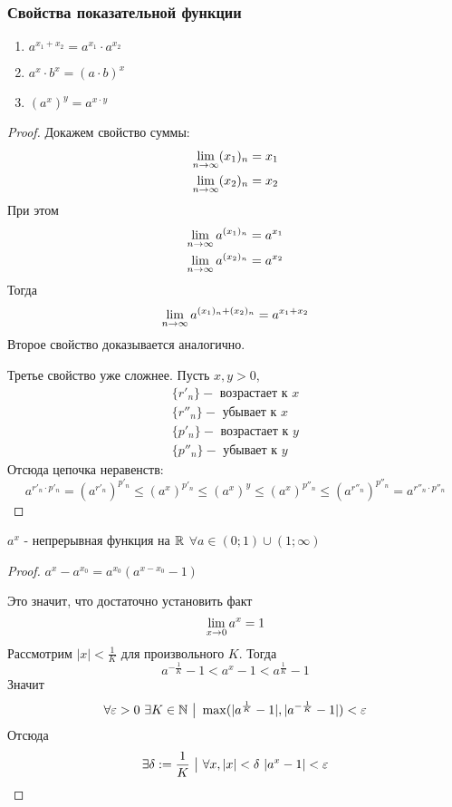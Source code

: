 \subsubsection*{Свойства показательной функции}

\begin{enumerate}
	\item $a^{x_1 + x_2} = a^{x_1} \cdot a^{x_2}$
	\item $a^x \cdot b^x = (a \cdot b)^x$
	\item $(a^x)^y = a^{x \cdot y}$
\end{enumerate}

\begin{proof}
	Докажем свойство суммы:
	\begin{align*}
		\lim\limits_{n \to \infty} (x_1)_n = x_1
		\\
		\lim\limits_{n \to \infty} (x_2)_n = x_2
	\end{align*}
	При этом
	\begin{align*}
		\lim\limits_{n \to \infty} a^{(x_1)_n} = a^{x_1}
		\\
		\lim\limits_{n \to \infty} a^{(x_2)_n} = a^{x_2}
	\end{align*}
	Тогда
	$$
		\lim\limits_{n \to \infty} a^{(x_1)_n + (x_2)_n} = a^{x_1 + x_2}
	$$
	Второе свойство доказывается аналогично.
	
	Третье свойство уже сложнее. Пусть $x, y > 0$,
	\begin{align*}
		\{r'_n\} - \text{ возрастает к } x
		\\
		\{r''_n\} - \text{ убывает к } x
		\\
		\{p'_n\} - \text{ возрастает к } y
		\\
		\{p''_n\} - \text{ убывает к } y
	\end{align*}
	Отсюда цепочка неравенств:
	$$
		a^{r'_n \cdot p'_n} = (a^{r'_n})^{p'_n} \le (a^x)^{p'_n} \le (a^x)^y \le (a^x)^{p''_n} \le (a^{r''_n})^{p''_n} = a^{r''_n \cdot p''_n}
	$$
\end{proof}

\begin{theorem}
	$a^x$ - непрерывная функция на $\mathbb{R}$ $\forall a \in (0; 1) \cup (1; \infty)$
\end{theorem}

\begin{proof}
	$a^x - a^{x_0} = a^{x_0}(a^{x - x_0} - 1)$
	
	Это значит, что достаточно установить факт
	$$
		\lim\limits_{x \to 0} a^x = 1
	$$
	Рассмотрим $|x| < \frac{1}{K}$ для произвольного $K$. Тогда
	$$
		a^{-\frac{1}{K}} - 1 < a^x - 1 < a^{\frac{1}{K}} - 1
	$$
	Значит
	$$
		\forall \varepsilon > 0\ \exists K \in \mathbb{N} \ \big|\  \max(|a^{\frac{1}{K}} - 1|, |a^{-\frac{1}{K}} - 1|) < \varepsilon
	$$
	Отсюда
	$$
		\exists \delta := \frac{1}{K} \ \big|\  \forall x, |x| < \delta\ |a^x - 1| < \varepsilon
	$$
\end{proof}

